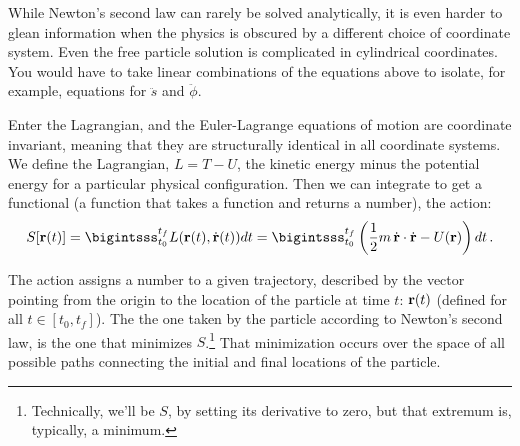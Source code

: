 While Newton's second law can rarely be solved analytically, it is even harder to glean information when the physics is obscured by a different choice of coordinate system. Even the free particle solution is complicated in cylindrical coordinates. You would have to take linear combinations of the equations above to isolate, for example, equations for $\ddot{s}$ and $\ddot{\phi}$. 

Enter the Lagrangian, and the Euler-Lagrange equations of motion are coordinate invariant, meaning that they are structurally identical in all coordinate systems. We define the Lagrangian, $L = T - U$, the kinetic energy minus the potential energy for a particular physical configuration. Then we can integrate to get a functional (a function that takes a function and returns a number), the action:
\begin{equation}\label{eq:JFrank_CFT_03.4}
S[\vb{r}(t)] = \bigintsss_{t_0}^{t_f} L(\vb{r}(t), \dot{\vb{r}}(t)) dt =
\bigintsss_{t_0}^{t_f} \left(\frac{1}{2} m \, \dot{\vb{r}} \cdot \dot{\vb{r}} - U(\vb{r})\right) dt\,.
\end{equation}

The action assigns a number to a given trajectory, described by the vector pointing from the origin to the location of the particle at time $t$: $\vb{r}(t)$ (defined for all $t \in [t_0, t_f]$). The  the one taken by the particle according to Newton's second law, is the one that minimizes $S$.\footnote{Technically, we'll be  $S$, by setting its derivative to zero, but that extremum is, typically, a minimum.} That minimization occurs over the space of all possible paths connecting the initial and final locations of the particle.

